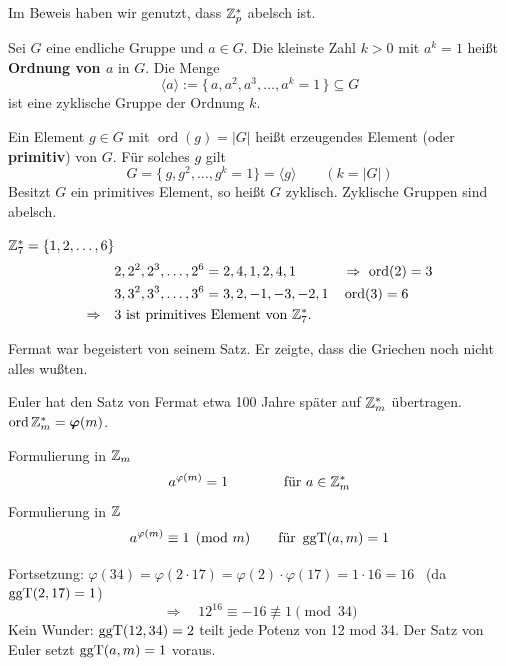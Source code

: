 Im Beweis haben wir genutzt, dass $\mathbb{Z}_{p}^*$ abelsch ist.

\begin{definition}[Bezeichnung]
Sei $G$ eine endliche Gruppe und $a \in G$. Die kleinste Zahl $k > 0$ mit $a^k = 1$ heißt \textbf{Ordnung von $a$} in $G$. Die Menge
\[
  \langle a \rangle := \{\, a, a^2, a^3, \ldots, a^k = 1 \,\} \subseteq G
\]
ist eine zyklische Gruppe der Ordnung $k$.

Ein Element $g \in G$ mit $\operatorname{ord}(g) = |G|$ heißt erzeugendes Element (oder \textbf{primitiv}) von $G$. Für solches $g$ gilt
\[
  G = \{\, g, g^2, \ldots, g^k = 1 \} = \langle g \rangle \qquad (k = |G|)
\]
Besitzt $G$ ein primitives Element, so heißt $G$ zyklisch. Zyklische Gruppen sind abelsch.
\end{definition}

\begin{beispiel}
$\mathbb{Z}_{7}^* = \{1, 2, \ldots, 6\}$
\begin{align*}
  & 2, 2^2, 2^3, \ldots, 2^6 = 2, 4, 1, 2, 4, 1 && \Rightarrow\ \operatorname{ord}(2) = 3 \\
  & 3, 3^2, 3^3, \ldots, 3^6 = 3, 2, -1, -3, -2, 1 && \operatorname{ord}(3) = 6 \\
  \Rightarrow\quad & 3 \text{ ist primitives Element von } \mathbb{Z}_{7}^*.
\end{align*}
\end{beispiel}

\begin{bemerkung}
Fermat war begeistert von seinem Satz. %
Er zeigte, dass die Griechen noch nicht alles wußten.

Euler hat den Satz von Fermat etwa 100 Jahre später auf $\mathbb{Z}_{m}^*$ übertragen.\\
$\operatorname{ord} \mathbb{Z}_{m}^* = \boldsymbol{\varphi}(m)$.
\end{bemerkung}

\begin{satz}[Euler]
Formulierung in $\mathbb{Z}_{m}$
\[
  a^{\varphi(m)} = 1 \qquad\qquad \text{für } a \in \mathbb{Z}_{m}^*
\]
Formulierung in $\mathbb{Z}$
\[
  a^{\varphi(m)} \equiv 1 \pmod{m} \qquad \text{für } \operatorname{ggT}(a, m) = 1
\]
\end{satz}

\begin{beispiel}
Fortsetzung: $\varphi(34) = \varphi(2 \cdot 17) = \varphi(2) \cdot \varphi(17) = 1 \cdot 16 = 16$ \ (da $\operatorname{ggT}(2, 17) = 1$)
\[
  \Rightarrow \quad 12^{16} \equiv -16 \not\equiv 1 \pmod{34}
\]
Kein Wunder: $\operatorname{ggT}(12, 34) = 2$ teilt jede Potenz von 12 mod 34. Der Satz von Euler setzt $\operatorname{ggT}(a, m) = 1$ voraus.
\end{beispiel}

